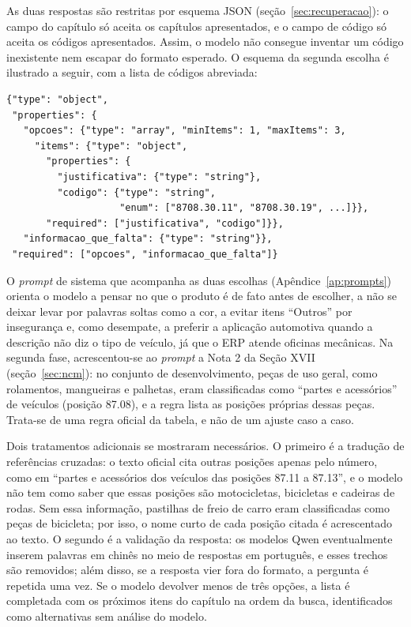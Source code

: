 As duas respostas são restritas por esquema JSON (seção~\ref{sec:recuperacao}): o campo do capítulo só aceita os capítulos apresentados, e o campo de código só aceita os códigos apresentados. Assim, o modelo não consegue inventar um código inexistente nem escapar do formato esperado. O esquema da segunda escolha é ilustrado a seguir, com a lista de códigos abreviada:

{\small
\begin{verbatim}
{"type": "object",
 "properties": {
   "opcoes": {"type": "array", "minItems": 1, "maxItems": 3,
     "items": {"type": "object",
       "properties": {
         "justificativa": {"type": "string"},
         "codigo": {"type": "string",
                    "enum": ["8708.30.11", "8708.30.19", ...]}},
       "required": ["justificativa", "codigo"]}},
   "informacao_que_falta": {"type": "string"}},
 "required": ["opcoes", "informacao_que_falta"]}
\end{verbatim}
}

O \textit{prompt} de sistema que acompanha as duas escolhas (Apêndice~\ref{ap:prompts}) orienta o modelo a pensar no que o produto é de fato antes de escolher, a não se deixar levar por palavras soltas como a cor, a evitar itens ``Outros'' por insegurança e, como desempate, a preferir a aplicação automotiva quando a descrição não diz o tipo de veículo, já que o ERP atende oficinas mecânicas. Na segunda fase, acrescentou-se ao \textit{prompt} a Nota 2 da Seção XVII (seção~\ref{sec:ncm}): no conjunto de desenvolvimento, peças de uso geral, como rolamentos, mangueiras e palhetas, eram classificadas como ``partes e acessórios'' de veículos (posição 87.08), e a regra lista as posições próprias dessas peças. Trata-se de uma regra oficial da tabela, e não de um ajuste caso a caso.

Dois tratamentos adicionais se mostraram necessários. O primeiro é a tradução de referências cruzadas: o texto oficial cita outras posições apenas pelo número, como em ``partes e acessórios dos veículos das posições 87.11 a 87.13'', e o modelo não tem como saber que essas posições são motocicletas, bicicletas e cadeiras de rodas. Sem essa informação, pastilhas de freio de carro eram classificadas como peças de bicicleta; por isso, o nome curto de cada posição citada é acrescentado ao texto. O segundo é a validação da resposta: os modelos Qwen eventualmente inserem palavras em chinês no meio de respostas em português, e esses trechos são removidos; além disso, se a resposta vier fora do formato, a pergunta é repetida uma vez. Se o modelo devolver menos de três opções, a lista é completada com os próximos itens do capítulo na ordem da busca, identificados como alternativas sem análise do modelo.

